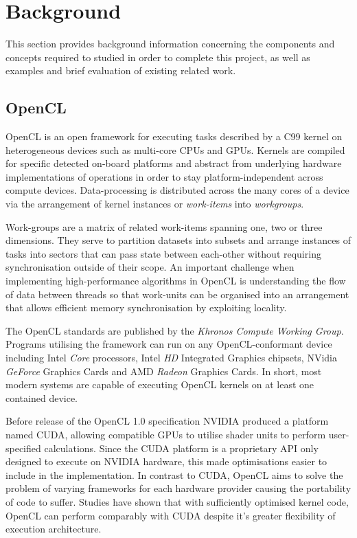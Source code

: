 \section{Background}
This section provides background information concerning the components and concepts required to studied in order to complete this project, as well as examples and brief evaluation of existing related work.
\subsection{OpenCL}
OpenCL is an open framework for executing tasks described by a C99 kernel on heterogeneous devices such as multi-core CPUs and GPUs. Kernels are compiled for specific detected on-board platforms and abstract from underlying hardware implementations of operations in order to stay platform-independent across compute devices. Data-processing is distributed across the many cores of a device via the arrangement of kernel instances or \emph{work-items} into \emph{workgroups}.

Work-groups are a matrix of related work-items spanning one, two or three dimensions. They serve to partition datasets into subsets and arrange instances of tasks into sectors that can pass state between each-other without requiring synchronisation outside of their scope. An important challenge when implementing high-performance algorithms in OpenCL is understanding the flow of data between threads so that work-units can be organised into an arrangement that allows efficient memory synchronisation by exploiting locality.

The OpenCL standards are published by the \emph{Khronos Compute Working Group}\cite{khronos}.
Programs utilising the framework can run on any OpenCL-conformant device including Intel \emph{Core} processors, Intel \emph{HD} Integrated Graphics chipsets, NVidia \emph{GeForce} Graphics Cards and AMD \emph{Radeon} Graphics Cards.
In short, most modern systems are capable of executing OpenCL kernels on at least one contained device.

Before release of the OpenCL 1.0 specification NVIDIA produced a platform named \ac{CUDA}, allowing compatible GPUs to utilise shader units to perform user-specified calculations. Since the CUDA platform is a proprietary API only designed to execute on NVIDIA hardware, this made optimisations easier to include in the implementation. In contrast to CUDA, OpenCL aims to solve the problem of varying frameworks for each hardware provider causing the portability of code to suffer. Studies have shown that with sufficiently optimised kernel code, OpenCL can perform comparably with CUDA despite it's greater flexibility of execution architecture\cite{perf}.
